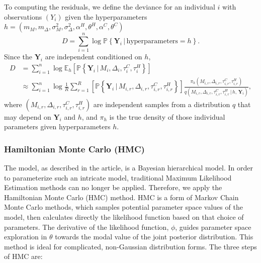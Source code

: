 \documentclass[
]{article}
\begin{document}
To computing the residuals, we define the deviance for an individual
\(i\) with observations \((Y_i)\) given the hyperparameters
\(h=(m_M,m_\Delta,\sigma^2_M,\sigma^2_\Delta,\alpha^H,\theta^H,\alpha^C,\theta^C)\)
\begin{equation}
  D= \sum_{i=1}^n \log \mathbb{P}\left\{ \mathbf{Y}_{i}\,|\, \text{hyperparameters}=h\right\}.
\end{equation} \newcommand{\wtb}{\widetilde\mathbf} Since the
\(\mathbf{Y}_i\) are independent conditioned on \(h\), \begin{align*}
D&= \sum_{i=1}^n \log \mathbb{E}_h\left[ \mathbb{P}\left\{ \mathbf{Y}_i \, |\, M_i,\Delta_i,\tau_i^{C},\tau_i^H \right\} \right]\\
    &\approx \sum_{i=1}^n \log \frac1R\sum_{r=1}^R \left[ \mathbb{P}\left\{ \mathbf{Y}_i \, |\, M_{i,r},\Delta_{i,r},\tau_{i,r}^{C},\tau_{i,r}^{H} \right\}\right] \frac{\pi_h(M_{i,r},\Delta_{i,r},\tau_{i,r}^{C},\tau_{i,r}^{H} )}{q(M_{i,r},\Delta_{i,r},\tau_{i,r}^{C},\tau_{i,r}^{H} \, | \, h,\, \mathbf{Y}_i)},
\end{align*} where
\((M_{i,r},\Delta_{i,r},\tau_{i,r}^{C},\tau_{i,r}^{H})\) are independent
samples from a distribution \(q\) that may depend on \(\mathbf{Y}_i\)
and \(h\), and \(\pi_h\) is the true density of those individual
parameters given hyperparameters \(h\).

\hypertarget{hamiltonian-monte-carlo-hmc}{%
\subsubsection{Hamiltonian Monte Carlo
(HMC)}\label{hamiltonian-monte-carlo-hmc}}

The model, as described in the article, is a Bayesian hierarchical
model. In order to parameterize such an intricate model, traditional
Maximum Likelihood Estimation methods can no longer be applied.
Therefore, we apply the Hamiltonian Monte Carlo (HMC) method. HMC is a
form of Markov Chain Monte Carlo methods, which samples potential
parameter space values of the model, then calculates directly the
likelihood function based on that choice of parameters. The derivative
of the likelihood function, \(\phi\), guides parameter space exploration
in \(\theta\) towards the modal value of the joint posterior
distribution. This method is ideal for complicated, non-Gaussian
distribution forms. The three steps of HMC are:
\end{document}
